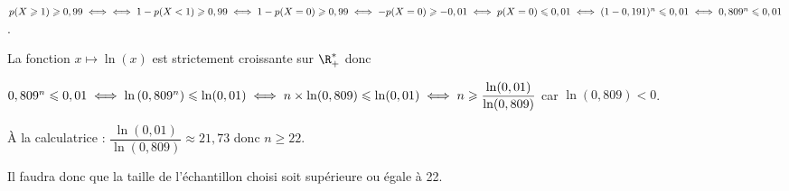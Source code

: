 \begin{enumerate}
	$p(X\geqslant 1)\geqslant 0,99 \iff  \iff 1-p(X<1)\geqslant 0,99 \iff 1-p(X=0)\geqslant 0,99 \iff -p(X=0)\geqslant -0,01 \\ \iff  p(X=0)\leqslant 0,01 \iff (1-0,191)^n\leqslant 0,01 \iff 0,809^n\leqslant 0,01$. 
	
La fonction $x\mapsto\ln(x)$ est strictement croissante sur $\R_+^*$ donc
	
	$0,809^n\leqslant 0,01 \iff \ln\left(0,809^n \right) \leqslant \ln(0,01) \iff n \times \ln(0,809) \leqslant \ln(0,01) \\ \iff n\geqslant \dfrac{\ln(0,01)}{\ln(0,809)}$ car $\ln(0,809)<0$. 

À la calculatrice : $\dfrac{\ln(0,01)}{\ln(0,809)}\approx 21,73$ donc $n\geqslant 22$.

Il faudra donc que la taille de l'échantillon choisi soit supérieure ou égale à 22.
\end{enumerate}

\bigskip


